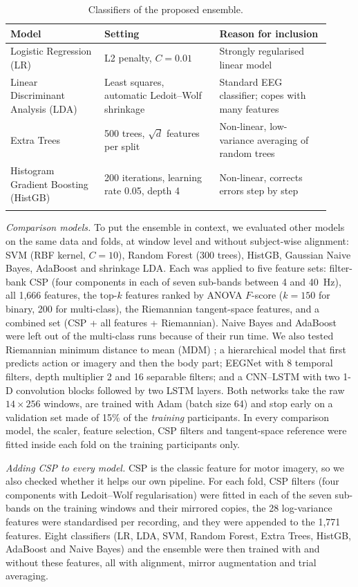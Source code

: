 \documentclass[pdflatex,sn-mathphys-num]{sn-jnl}%
\theoremstyle{thmstyleone}%
\theoremstyle{thmstyletwo}%
\theoremstyle{thmstylethree}%
\begin{document}
\begin{table}[htbp]
\centering
\caption{Classifiers of the proposed ensemble.}
\label{tab:models}
\footnotesize
\begin{tabular}{@{}p{0.27\linewidth}p{0.33\linewidth}p{0.32\linewidth}@{}}
\toprule
Model & Setting & Reason for inclusion \\
\midrule
Logistic Regression (LR) & L2 penalty, $C = 0.01$ & Strongly regularised linear model \\
Linear Discriminant Analysis (LDA) & Least squares, automatic Ledoit--Wolf shrinkage & Standard EEG classifier; copes with many features \\
Extra Trees & 500 trees, $\sqrt{d}$ features per split & Non-linear, low-variance averaging of random trees \\
Histogram Gradient Boosting (HistGB) & 200 iterations, learning rate 0.05, depth 4 & Non-linear, corrects errors step by step \\
\botrule
\end{tabular}
\end{table}

\emph{Comparison models.} To put the ensemble in context, we evaluated other models on the same data and folds, at window level and without subject-wise alignment: SVM (RBF kernel, $C = 10$), Random Forest (300 trees), HistGB, Gaussian Naive Bayes, AdaBoost and shrinkage LDA. Each was applied to five feature sets: filter-bank CSP (four components in each of seven sub-bands between 4 and 40~Hz), all 1,666 features, the top-$k$ features ranked by ANOVA $F$-score ($k = 150$ for binary, 200 for multi-class), the Riemannian tangent-space features, and a combined set (CSP + all features + Riemannian). Naive Bayes and AdaBoost were left out of the multi-class runs because of their run time. We also tested Riemannian minimum distance to mean (MDM) \citep{Barachant2012}; a hierarchical model that first predicts action or imagery and then the body part; EEGNet \citep{Lawhern2018} with 8 temporal filters, depth multiplier 2 and 16 separable filters; and a CNN--LSTM with two 1-D convolution blocks followed by two LSTM layers. Both networks take the raw $14 \times 256$ windows, are trained with Adam (batch size 64) and stop early on a validation set made of 15\% of the \emph{training} participants. In every comparison model, the scaler, feature selection, CSP filters and tangent-space reference were fitted inside each fold on the training participants only.

\emph{Adding CSP to every model.} CSP is the classic feature for motor imagery, so we also checked whether it helps our own pipeline. For each fold, CSP filters (four components with Ledoit--Wolf regularisation) were fitted in each of the seven sub-bands on the training windows and their mirrored copies, the 28 log-variance features were standardised per recording, and they were appended to the 1,771 features. Eight classifiers (LR, LDA, SVM, Random Forest, Extra Trees, HistGB, AdaBoost and Naive Bayes) and the ensemble were then trained with and without these features, all with alignment, mirror augmentation and trial averaging.
\end{document}
